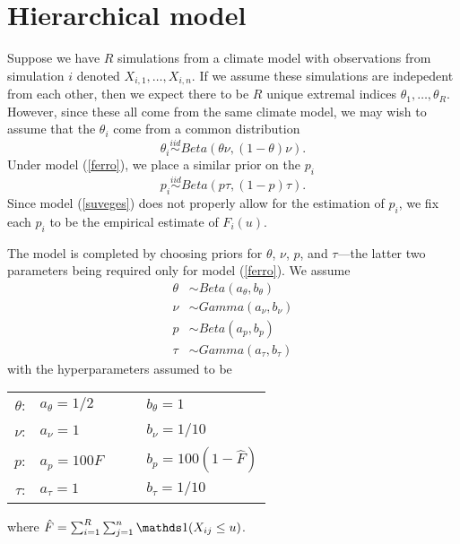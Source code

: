 \section{Hierarchical model}
\label{model}

Suppose we have $R$ simulations from a climate model with observations from simulation $i$ denoted $X_{i,1},\ldots,X_{i,n}$. If we assume these simulations are indepedent from each other, then we expect there to be $R$ unique extremal indices $\theta_1,\ldots,\theta_R$. However, since these all come from the same climate model, we may wish to assume that the $\theta_i$ come from a common distribution
\[ \theta_i \overset{iid}\sim Beta\left(\theta\nu, (1-\theta)\nu\right). \]
Under model (\ref{ferro}), we place a similar prior on the $p_i$
\[ p_i \overset{iid}\sim Beta\left(p\tau, (1-p)\tau\right). \]
Since model (\ref{suveges}) does not properly allow for the estimation of $p_i$, we fix each $p_i$ to be the empirical estimate of $F_i(u)$.

The model is completed by choosing priors for $\theta$, $\nu$, $p$, and $\tau$---the latter two parameters being required only for model (\ref{ferro}). We assume
\begin{align*}
\theta &\sim Beta(a_\theta, b_\theta) \\
\nu &\sim Gamma(a_\nu, b_\nu) \\
p &\sim Beta(a_p, b_p) \\
\tau &\sim Gamma(a_\tau, b_\tau) 
\end{align*}
with the hyperparameters assumed to be
\begin{center}
\begin{tabular}{rlcl}
$\theta$: & $a_\theta = 1/2        $ &~~& $b_\theta = 1               $ \\
$   \nu$: & $   a_\nu = 1          $ &~~& $   b_\nu = 1/10            $ \\
$     p$: & $     a_p = 100 \hat{F}$ &~~& $     b_p = 100 (1-\hat{F}) $ \\
$  \tau$: & $  a_\tau = 1          $ &~~& $  b_\tau = 1/10            $ \\
\end{tabular}
\end{center}
where $\hat{F}=\sum_{i=1}^R\sum_{j=1}^n \ind(X_{ij}\leq u)$.
